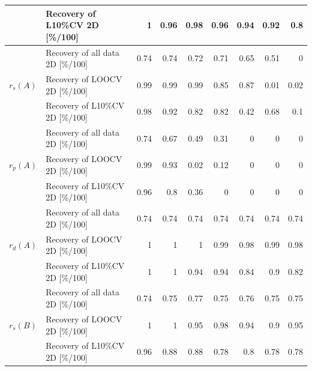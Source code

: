 \documentclass[11pt,oneside,czech,american]{book} %
\theoremstyle{definition} %
\theoremstyle{definition}
\begin{document}
\begin{table}[H]
\begin{tabular}{llrrrrrrr}
	& Recovery of L10\%CV 2D [\%/100]  & 1             & 0.96          & 0.98          & 0.96         & 0.94          & 0.92          & 0.8            \\ 
	\hline
	\multirow{3}{*}{$r_s(A)$} & Recovery of all data 2D [\%/100] & 0.74          & 0.74          & 0.72          & 0.71         & 0.65          & 0.51          & 0              \\
	& Recovery of LOOCV 2D [\%/100]    & 0.99          & 0.99          & 0.99          & 0.85         & 0.87          & 0.01          & 0.02           \\
	& Recovery of L10\%CV 2D [\%/100]  & 0.98          & 0.92          & 0.82          & 0.82         & 0.42          & 0.68          & 0.1            \\ 
	\hline
	\multirow{3}{*}{$r_p(A)$} & Recovery of all data 2D [\%/100] & 0.74          & 0.67          & 0.49          & 0.31         & 0             & 0             & 0              \\
	& Recovery of LOOCV 2D [\%/100]    & 0.99          & 0.93          & 0.02          & 0.12         & 0             & 0             & 0              \\
	& Recovery of L10\%CV 2D [\%/100]  & 0.96          & 0.8           & 0.36          & 0            & 0             & 0             & 0              \\ 
	\hline
	\multirow{3}{*}{$r_d(A)$} & Recovery of all data 2D [\%/100] & 0.74          & 0.74          & 0.74          & 0.74         & 0.74          & 0.74          & 0.74           \\
	& Recovery of LOOCV 2D [\%/100]    & 1             & 1             & 1             & 0.99         & 0.98          & 0.99          & 0.98           \\
	& Recovery of L10\%CV 2D [\%/100]  & 1             & 1             & 0.94          & 0.94         & 0.84          & 0.9           & 0.82           \\ 
	\hline
	\multirow{3}{*}{$r_s(B)$} & Recovery of all data 2D [\%/100] & 0.74          & 0.75          & 0.77          & 0.75         & 0.76          & 0.75          & 0.75           \\
	& Recovery of LOOCV 2D [\%/100]    & 1             & 1             & 0.95          & 0.98         & 0.94          & 0.9           & 0.95           \\
	& Recovery of L10\%CV 2D [\%/100]  & 0.96          & 0.88          & 0.88          & 0.78         & 0.8           & 0.78          & 0.78           \\ 

\end{tabular}
\end{table}
\end{document}
